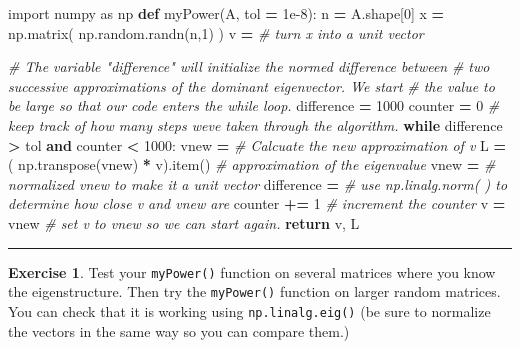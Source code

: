 \documentclass[
]{book}
\newenvironment{Shaded}{\begin{snugshade}}{\end{snugshade}}
\newcommand{\CommentTok}[1]{\textcolor[rgb]{0.56,0.35,0.01}{\textit{#1}}}
\newcommand{\ControlFlowTok}[1]{\textcolor[rgb]{0.13,0.29,0.53}{\textbf{#1}}}
\newcommand{\DecValTok}[1]{\textcolor[rgb]{0.00,0.00,0.81}{#1}}
\newcommand{\FloatTok}[1]{\textcolor[rgb]{0.00,0.00,0.81}{#1}}
\newcommand{\ImportTok}[1]{#1}
\newcommand{\KeywordTok}[1]{\textcolor[rgb]{0.13,0.29,0.53}{\textbf{#1}}}
\newcommand{\NormalTok}[1]{#1}
\newcommand{\OperatorTok}[1]{\textcolor[rgb]{0.81,0.36,0.00}{\textbf{#1}}}
\theoremstyle{definition}
\theoremstyle{definition}
\theoremstyle{definition}
\newtheorem{exercise}{Exercise}[chapter]
\theoremstyle{remark}
\begin{document}
\begin{Shaded}
\begin{Highlighting}[]
\ImportTok{import}\NormalTok{ numpy }\ImportTok{as}\NormalTok{ np}
\KeywordTok{def}\NormalTok{ myPower(A, tol }\OperatorTok{=} \FloatTok{1e{-}8}\NormalTok{):}
\NormalTok{    n }\OperatorTok{=}\NormalTok{ A.shape[}\DecValTok{0}\NormalTok{]}
\NormalTok{    x }\OperatorTok{=}\NormalTok{ np.matrix( np.random.randn(n,}\DecValTok{1}\NormalTok{) )}
\NormalTok{    v }\OperatorTok{=} \CommentTok{\# turn x into a unit vector}
    
    \CommentTok{\# The variable "difference" will initialize the normed difference between}
    \CommentTok{\# two successive approximations of the dominant eigenvector.  We start }
    \CommentTok{\# the value to be large so that our code enters the while loop.}
\NormalTok{    difference }\OperatorTok{=} \DecValTok{1000} 
\NormalTok{    counter }\OperatorTok{=} \DecValTok{0} \CommentTok{\# keep track of how many steps we\textquotesingle{}ve taken through the algorithm.}
    \ControlFlowTok{while}\NormalTok{ difference }\OperatorTok{\textgreater{}}\NormalTok{ tol }\KeywordTok{and}\NormalTok{ counter }\OperatorTok{\textless{}} \DecValTok{1000}\NormalTok{:}
\NormalTok{        vnew }\OperatorTok{=} \CommentTok{\# Calcuate the new approximation of v}
\NormalTok{        L }\OperatorTok{=}\NormalTok{ ( np.transpose(vnew) }\OperatorTok{*}\NormalTok{ v).item() }\CommentTok{\# approximation of the eigenvalue}
\NormalTok{        vnew }\OperatorTok{=} \CommentTok{\# normalized vnew to make it a unit vector}
\NormalTok{        difference }\OperatorTok{=} \CommentTok{\# use np.linalg.norm( ) to determine how close v and vnew are}
\NormalTok{        counter }\OperatorTok{+=} \DecValTok{1} \CommentTok{\# increment the counter}
\NormalTok{        v }\OperatorTok{=}\NormalTok{ vnew }\CommentTok{\# set v to vnew so we can start again.}
    \ControlFlowTok{return}\NormalTok{ v, L}
\end{Highlighting}
\end{Shaded}

\begin{center}\rule{0.5\linewidth}{0.5pt}\end{center}

\begin{exercise}
\protect\hypertarget{exr:unnamed-chunk-369}{}{\label{exr:unnamed-chunk-369} }Test your \texttt{myPower()} function on several matrices where you know the eigenstructure. Then try the \texttt{myPower()} function on larger random matrices. You can check that it is working using \texttt{np.linalg.eig()} (be sure to normalize the vectors in the same way so you can compare them.)
\end{exercise}
\end{document}
